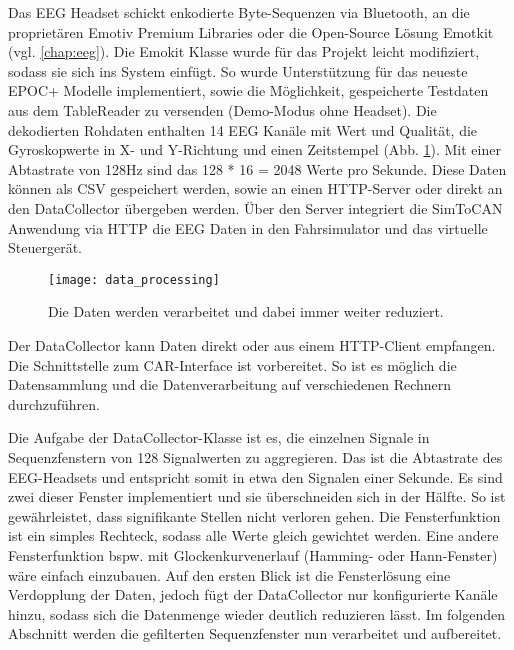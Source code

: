 \label{sec:fetching}
 
Das EEG Headset schickt enkodierte Byte-Sequenzen via Bluetooth, an die proprietären Emotiv Premium Libraries oder die Open-Source Lösung Emotkit (vgl. \ref{chap:eeg}). Die Emokit Klasse wurde für das Projekt leicht modifiziert, sodass sie sich ins System einfügt. So wurde Unterstützung für das neueste EPOC+ Modelle implementiert, sowie die Möglichkeit, gespeicherte Testdaten aus dem TableReader zu versenden (Demo-Modus ohne Headset). 
Die dekodierten Rohdaten enthalten 14 EEG Kanäle mit Wert und Qualität, die Gyroskopwerte in X- und Y-Richtung und einen Zeitstempel (Abb. \ref{fig:data_processing}). Mit einer Abtastrate von 128Hz sind das 128 * 16 = 2048 Werte pro Sekunde. Diese Daten können als CSV gespeichert werden, sowie an einen HTTP-Server oder direkt an den DataCollector übergeben werden. Über den Server integriert die SimToCAN Anwendung via HTTP die EEG Daten in den Fahrsimulator und das virtuelle Steuergerät.

\begin{figure}[h] 
  \begin{center}
    \texttt{[image: data\_processing]}
    \caption[Datenverarbeitungskette]{Die Daten werden verarbeitet und dabei immer weiter reduziert. \label{fig:data_processing}}
  \end{center}
\end{figure}

Der DataCollector kann Daten direkt oder aus einem HTTP-Client empfangen. Die Schnittstelle zum CAR-Interface ist vorbereitet. So ist es möglich die Datensammlung und die Datenverarbeitung auf verschiedenen Rechnern durchzuführen.

Die Aufgabe der DataCollector-Klasse ist es, die einzelnen Signale in Sequenzfenstern von 128 Signalwerten zu aggregieren. Das ist die Abtastrate des EEG-Headsets und entspricht somit in etwa den Signalen einer Sekunde. Es sind zwei dieser Fenster implementiert und sie überschneiden sich in der Hälfte. So ist gewährleistet, dass signifikante Stellen nicht verloren gehen. Die Fensterfunktion ist ein simples Rechteck, sodass alle Werte gleich gewichtet werden. Eine andere Fensterfunktion bspw. mit Glockenkurvenerlauf (Hamming- oder Hann-Fenster) wäre einfach einzubauen. Auf den ersten Blick ist die Fensterlösung eine Verdopplung der Daten, jedoch fügt der DataCollector nur konfigurierte Kanäle hinzu, sodass sich die Datenmenge wieder deutlich reduzieren lässt. Im folgenden Abschnitt werden die gefilterten Sequenzfenster nun verarbeitet und aufbereitet.

